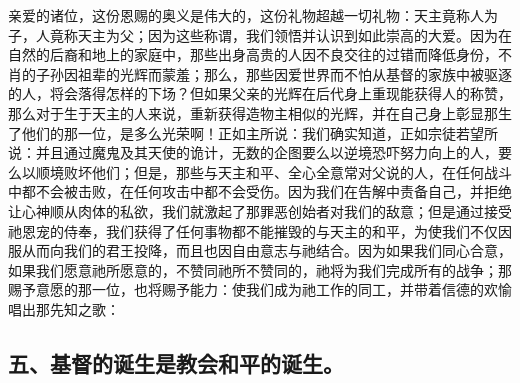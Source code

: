 亲爱的诸位，这份恩赐的奥义是伟大的，这份礼物超越一切礼物：天主竟称人为子，人竟称天主为父；因为这些称谓，我们领悟并认识到如此崇高的大爱。因为在自然的后裔和地上的家庭中，那些出身高贵的人因不良交往的过错而降低身份，不肖的子孙因祖辈的光辉而蒙羞；那么，那些因爱世界而不怕从基督的家族中被驱逐的人，将会落得怎样的下场？但如果父亲的光辉在后代身上重现能获得人的称赞，那么对于生于天主的人来说，重新获得造物主相似的光辉，并在自己身上彰显那生了他们的那一位，是多么光荣啊！正如主所说：我们确实知道，正如宗徒若望所说：并且通过魔鬼及其天使的诡计，无数的企图要么以逆境恐吓努力向上的人，要么以顺境败坏他们；但是，那些与天主和平、全心全意常对父说的人，在任何战斗中都不会被击败，在任何攻击中都不会受伤。因为我们在告解中责备自己，并拒绝让心神顺从肉体的私欲，我们就激起了那罪恶创始者对我们的敌意；但是通过接受祂恩宠的侍奉，我们获得了任何事物都不能摧毁的与天主的和平，为使我们不仅因服从而向我们的君王投降，而且也因自由意志与祂结合。因为如果我们同心合意，如果我们愿意祂所愿意的，不赞同祂所不赞同的，祂将为我们完成所有的战争；那赐予意愿的那一位，也将赐予能力：使我们成为祂工作的同工，并带着信德的欢愉唱出那先知之歌：\par


\subsection{五、基督的诞生是教会和平的诞生。}

